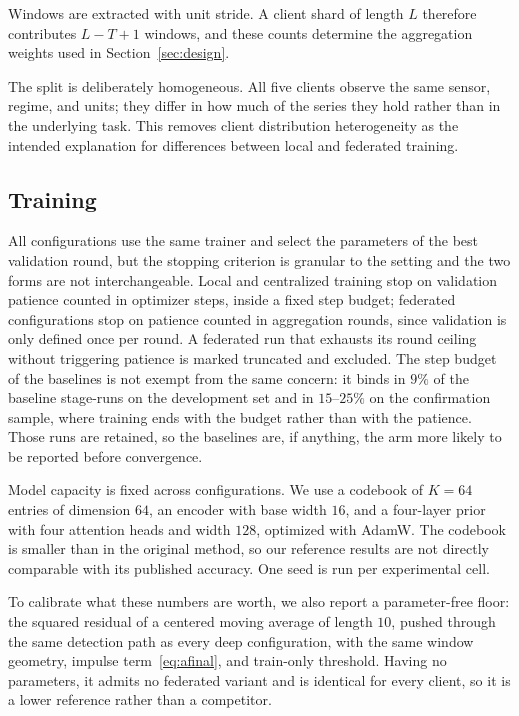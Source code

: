 \documentclass[conference]{IEEEtran}
\begin{document}
Windows are extracted with unit stride. A client shard of length $L$ therefore contributes $L-T+1$ windows, and these counts determine the aggregation weights used in Section~\ref{sec:design}.

The split is deliberately homogeneous. All five clients observe the same sensor, regime, and units; they differ in how much of the series they hold rather than in the underlying task. This removes client distribution heterogeneity as the intended explanation for differences between local and federated training.

\subsection{Training}

All configurations use the same trainer and select the parameters of the best validation round, but the stopping criterion is granular to the setting and the two forms are not interchangeable. Local and centralized training stop on validation patience counted in optimizer steps, inside a fixed step budget; federated configurations stop on patience counted in aggregation rounds, since validation is only defined once per round. A federated run that exhausts its round ceiling without triggering patience is marked truncated and excluded. The step budget of the baselines is not exempt from the same concern: it binds in $9\%$ of the baseline stage-runs on the development set and in $15$--$25\%$ on the confirmation sample, where training ends with the budget rather than with the patience. Those runs are retained, so the baselines are, if anything, the arm more likely to be reported before convergence.

Model capacity is fixed across configurations. We use a codebook of $K=64$ entries of dimension $64$, an encoder with base width $16$, and a four-layer prior with four attention heads and width $128$, optimized with AdamW. The codebook is smaller than in the original method, so our reference results are not directly comparable with its published accuracy. One seed is run per experimental cell.

To calibrate what these numbers are worth, we also report a parameter-free floor: the squared residual of a centered moving average of length $10$, pushed through the same detection path as every deep configuration, with the same window geometry, impulse term~\eqref{eq:afinal}, and train-only threshold. Having no parameters, it admits no federated variant and is identical for every client, so it is a lower reference rather than a competitor.
\end{document}
